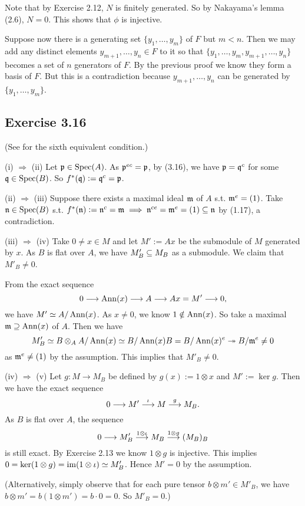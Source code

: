 \documentclass[../A&M.tex]{subfiles}
\begin{document}
Note that by Exercise 2.12, $N$ is finitely generated. So by Nakayama's lemma (2.6), $N=0$. This shows that $\phi$ is injective.

Suppose now there is a generating set $\{y_1,\ldots,y_m\}$ of $F$ but $m<n$. Then we may add any distinct elements $y_{m+1},\ldots,y_n \in F$ to it so that $\{y_1,\ldots,y_m,y_{m+1},\ldots,y_n\}$ becomes a set of $n$ generators of $F$. By the previous proof we know they form a basis of $F$. But this is a contradiction because $y_{m+1},\ldots,y_n$ can be generated by $\{y_1,\ldots,y_m\}$.

\subsection*{Exercise 3.16}

(See  for the sixth equivalent condition.)

(i) $\Rightarrow$ (ii) Let $\mathfrak{p} \in \operatorname{Spec}(A)$. As $\mathfrak{p}^{ec} = \mathfrak{p}$, by (3.16), we have $\mathfrak{p} = \mathfrak{q}^c$ for some $\mathfrak{q}\in\operatorname{Spec}(B)$. So $f^*(\mathfrak{q}) := \mathfrak{q}^c = \mathfrak{p}$.

(ii) $\Rightarrow$ (iii) Suppose there exists a maximal ideal $\mathfrak{m}$ of $A$ s.t. $\mathfrak{m}^e=(1)$. Take $\mathfrak{n} \in \operatorname{Spec}(B)$ s.t. $f^*(\mathfrak{n}) := \mathfrak{n}^c = \mathfrak{m} \implies \mathfrak{n}^{ce} = \mathfrak{m}^e = (1) \subseteq \mathfrak{n}$ by (1.17), a contradiction.

(iii) $\Rightarrow$ (iv) Take $0\neq x \in M$ and let $M' := Ax$ be the submodule of $M$ generated by $x$. As $B$ is flat over $A$, we have $M'_B \subseteq M_B$ as a submodule. We claim that $M'_B\neq0$. 

From the exact sequence
$$
0 \longrightarrow \operatorname{Ann}(x) \longrightarrow A \longrightarrow Ax = M' \longrightarrow 0,
$$
we have $M' \simeq A/\operatorname{Ann}(x)$. As $x\neq0$, we know $1 \notin \operatorname{Ann}(x)$. So take a maximal $\mathfrak{m} \supseteq \operatorname{Ann}(x)$ of $A$. Then we have
$$
M'_B \simeq B \otimes_A A/\operatorname{Ann}(x) \simeq B/\operatorname{Ann}(x)B = B/\operatorname{Ann}(x)^e \twoheadrightarrow B/\mathfrak{m}^e \neq 0
$$
as $\mathfrak{m}^e \neq (1)$ by the assumption. This implies that $M'_B \neq 0$.

(iv) $\Rightarrow$ (v) Let $g: M\to M_B$ be defined by $g(x):=1\otimes x$ and $M':=\ker g$. Then we have the exact sequence
$$
0 \longrightarrow M' \overset{\iota}{\longrightarrow} M \overset{g}{\longrightarrow} M_B.
$$
As $B$ is flat over $A$, the sequence
$$
0 \longrightarrow M'_B \overset{1 \otimes \iota}{\longrightarrow} M_B \overset{1 \otimes g}{\longrightarrow} (M_B)_B
$$
is still exact. By Exercise 2.13 we know $1\otimes g$ is injective. This implies $0 = \ker(1\otimes g) = \operatorname{im}(1\otimes \iota) \simeq M'_B$. Hence $M'=0$ by the assumption.

(Alternatively, simply observe that for each pure tensor $b \otimes m' \in M'_B$, we have $b \otimes m' = b(1\otimes m') = b\cdot 0 = 0$. So $M'_B = 0$.)
\end{document}
